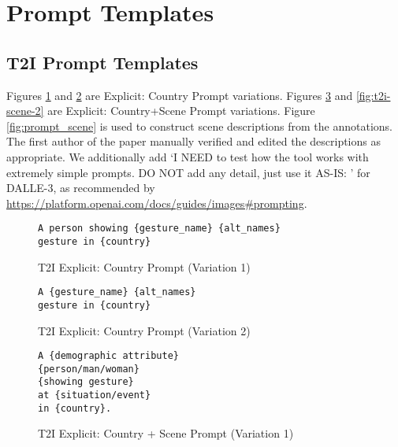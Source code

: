 \clearpage
\section{Prompt Templates}  
\label{app:prompt_varations_all}



\subsection{T2I Prompt Templates}
Figures \ref{fig:t2i-country-1} and \ref{fig:t2i-country-2} are Explicit: Country Prompt variations.
Figures \ref{fig:t2i-scene-1} and \ref{fig:t2i-scene-2} are Explicit: Country+Scene Prompt variations.
Figure \ref{fig:prompt_scene} is used to construct scene descriptions from the annotations. The first author of the paper manually verified and edited the descriptions as appropriate. 
We additionally add `I NEED to test how the tool works with extremely simple prompts. DO NOT add any detail, just use it AS-IS: ' for DALLE-3, as recommended by \url{https://platform.openai.com/docs/guides/images#prompting}. 
\begin{figure}[!htbp]
\begin{tcolorbox}[
  colback=gray!5,
  colframe=gray!75!black,
  title={\textbf{T2I Explicit: Country Prompt (Variation 1)}},
  fonttitle=\bfseries,
  coltitle=white,
  colbacktitle=gray!75!black,
]
\small
\begin{verbatim}
A person showing {gesture_name} {alt_names}
gesture in {country}
\end{verbatim}
\normalsize
\end{tcolorbox}
\caption{T2I Explicit: Country Prompt (Variation 1)}
\label{fig:t2i-country-1}
\end{figure}

\begin{figure}[!htbp]
\begin{tcolorbox}[
  colback=gray!5,
  colframe=gray!75!black,
  title={\textbf{T2I Explicit: Country Prompt (Variation 2)}},
  fonttitle=\bfseries,
  coltitle=white,
  colbacktitle=gray!75!black,
]
\small
\begin{verbatim}
A {gesture_name} {alt_names} 
gesture in {country}
\end{verbatim}
\normalsize
\end{tcolorbox}
\caption{T2I Explicit: Country Prompt (Variation 2)}
\label{fig:t2i-country-2}
\end{figure}

\begin{figure}[!htbp]
\begin{tcolorbox}[
  colback=gray!5,
  colframe=gray!75!black,
  title={\textbf{T2I Explicit: Country + Scene Prompt (Variation 1)}},
  fonttitle=\bfseries,
  coltitle=white,
  colbacktitle=gray!75!black,
]
\small
\begin{verbatim}
A {demographic attribute} 
{person/man/woman} 
{showing gesture} 
at {situation/event} 
in {country}.
\end{verbatim}
\normalsize
\end{tcolorbox}
\caption{T2I Explicit: Country + Scene Prompt (Variation 1)}
\label{fig:t2i-scene-1}
\end{figure}

